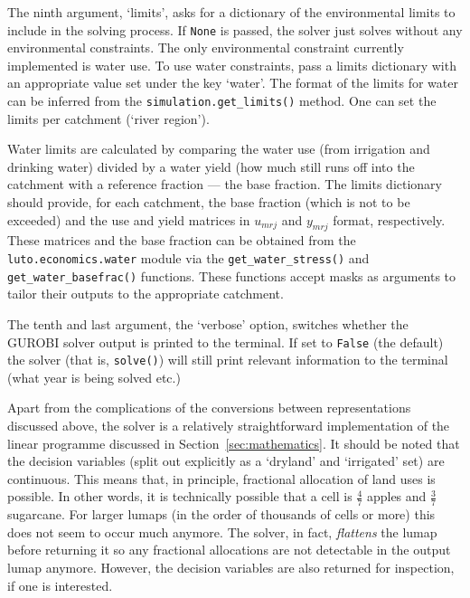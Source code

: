 \documentclass{draft}
\begin{document}
The ninth argument, `limits', asks for a dictionary of the environmental limits to include in the solving process. If \texttt{None} is passed, the solver just solves without any environmental constraints. The only environmental constraint currently implemented is water use. To use water constraints, pass a limits dictionary with an appropriate value set under the key `water'. The format of the limits for water can be inferred from the \texttt{simulation.get_limits()} method. One can set the limits per catchment (`river region').

Water limits are calculated by comparing the water use (from irrigation and drinking water) divided by a water yield (how much still runs off into the catchment with a reference fraction --- the base fraction. The limits dictionary should provide, for each catchment, the base fraction (which is not to be exceeded) and the use and yield matrices in $u_{mrj}$ and $y_{mrj}$ format, respectively. These matrices and the base fraction can be obtained from the \texttt{luto.economics.water} module via the \texttt{get_water_stress()} and \texttt{get_water_basefrac()} functions. These functions accept masks as arguments to tailor their outputs to the appropriate catchment.

The tenth and last argument, the `verbose' option, switches whether the GUROBI solver output is printed to the terminal. If set to \texttt{False} (the default) the solver (that is, \texttt{solve()}) will still print relevant information to the terminal (what year is being solved etc.)

Apart from the complications of the conversions between representations discussed above, the solver is a relatively straightforward implementation of the linear programme discussed in Section~\ref{sec:mathematics}. It should be noted that the decision variables (split out explicitly as a `dryland' and `irrigated' set) are continuous. This means that, in principle, fractional allocation of land uses is possible. In other words, it is technically possible that a cell is $\textstyle\frac{4}{7}$ apples and $\textstyle\frac{3}{7}$ sugarcane. For larger lumaps (in the order of thousands of cells or more) this does not seem to occur much anymore. The solver, in fact, \emph{flattens} the lumap before returning it so any fractional allocations are not detectable in the output lumap anymore. However, the decision variables are also returned for inspection, if one is interested. 
\end{document}
